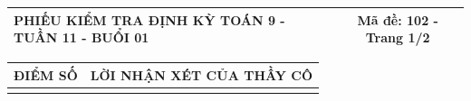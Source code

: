 \documentclass[12pt,a4paper]{article}
\begin{document}
\newpage
\noindent
\begin{tabularx}{\linewidth}{|X|c|}
\hline
\textbf{PHIẾU KIỂM TRA ĐỊNH KỲ TOÁN 9 - TUẦN 11 - BUỔI 01} & \textbf{Mã đề: 102 - Trang 1/2} \\
\hline
\end{tabularx}

\vspace{1.0mm}

\noindent
\begin{tabularx}{\linewidth}{|p{3.2cm}|X|}
\hline
\centering\textbf{ĐIỂM SỐ} & \centering\textbf{LỜI NHẬN XÉT CỦA THẦY CÔ} \tabularnewline
\hline
\rule{0pt}{1.8cm} & \tabularnewline
\hline
\end{tabularx}
\end{document}
